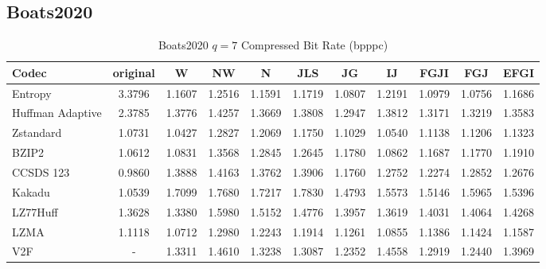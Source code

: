 \documentclass{article}
\begin{document}
\subsection{Boats2020}
\begin{table}[h!]
\centering
\caption{Boats2020 $q=7$ Compressed Bit Rate (bpppc)}
\begin{tabular}{|l|cccccccccc|}
\hline
Codec &  original &      W &     NW &      N &    JLS &     JG &     IJ &   FGJI &    FGJ &   EFGI \\
\hline
Entropy & 3.3796 & 1.1607 & 1.2516 & 1.1591 & 1.1719 & 1.0807 & 1.2191 & 1.0979 & 1.0756 & 1.1686 \\
\hline
Huffman Adaptive &    2.3785 & 1.3776 & 1.4257 & 1.3669 & 1.3808 & 1.2947 & 1.3812 & 1.3171 & 1.3219 & 1.3583 \\
Zstandard        &    1.0731 & 1.0427 & 1.2827 & 1.2069 & 1.1750 & 1.1029 & 1.0540 & 1.1138 & 1.1206 & 1.1323 \\
BZIP2            &    1.0612 & 1.0831 & 1.3568 & 1.2845 & 1.2645 & 1.1780 & 1.0862 & 1.1687 & 1.1770 & 1.1910 \\
CCSDS 123        &    0.9860 & 1.3888 & 1.4163 & 1.3762 & 1.3906 & 1.1760 & 1.2752 & 1.2274 & 1.2852 & 1.2676 \\
Kakadu           &    1.0539 & 1.7099 & 1.7680 & 1.7217 & 1.7830 & 1.4793 & 1.5573 & 1.5146 & 1.5965 & 1.5396 \\
LZ77Huff         &    1.3628 & 1.3380 & 1.5980 & 1.5152 & 1.4776 & 1.3957 & 1.3619 & 1.4031 & 1.4064 & 1.4268 \\
LZMA             &    1.1118 & 1.0712 & 1.2980 & 1.2243 & 1.1914 & 1.1261 & 1.0855 & 1.1386 & 1.1424 & 1.1587 \\
V2F              &   - & 1.3311 & 1.4610 & 1.3238 & 1.3087 & 1.2352 & 1.4558 & 1.2919 & 1.2440 & 1.3969 \\
\hline
\end{tabular}
\end{table}
\end{document}
